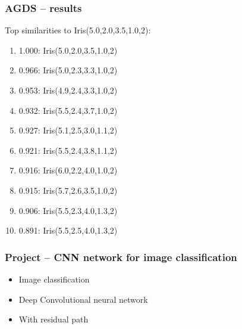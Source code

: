 \documentclass{beamer}
\begin{document}
\begin{frame}
\frametitle{AGDS -- results}
Top similarities to Iris(5.0,2.0,3.5,1.0,2):
\begin{enumerate}
\item 1.000: Iris(5.0,2.0,3.5,1.0,2)
\item 0.966: Iris(5.0,2.3,3.3,1.0,2)
\item 0.953: Iris(4.9,2.4,3.3,1.0,2)
\item 0.932: Iris(5.5,2.4,3.7,1.0,2)
\item 0.927: Iris(5.1,2.5,3.0,1.1,2)
\item 0.921: Iris(5.5,2.4,3.8,1.1,2)
\item 0.916: Iris(6.0,2.2,4.0,1.0,2)
\item 0.915: Iris(5.7,2.6,3.5,1.0,2)
\item 0.906: Iris(5.5,2.3,4.0,1.3,2)
\item 0.891: Iris(5.5,2.5,4.0,1.3,2)
\end{enumerate}

\end{frame}

\begin{frame}
\frametitle{Project -- CNN network for image classification}
\begin{itemize}
	\item Image classification
	\item Deep Convolutional neural network
	\item With residual path
\end{itemize}
\end{frame}
\end{document}
